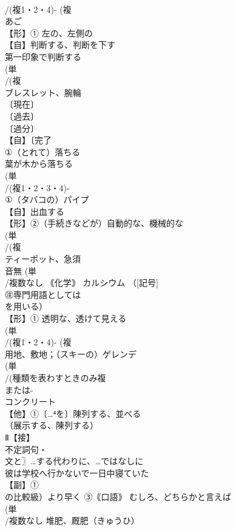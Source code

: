 \documentclass[8pt]{extreport}
\begin{document}
\begin{CJK}{UTF8}{min}
\\	/(複1・2・4)- (複
\\	あご
\\	【形】① 左の、左側の 
\\	【自】判断する、判断を下す 
\\	第一印象で判断する
\\	(単
\\	/(複
\\	ブレスレット、腕輪 
\\	〔現在〕
\\	〔過去〕
\\	〔過分〕
\\	【自】〔完了
\\	①（とれて）落ちる 
\\	葉が木から落ちる
\\	(単
\\	/(複1・2・3・4)‐
\\	①（タバコの）パイプ 
\\	【自】出血する 
\\	【形】②（手続きなどが）自動的な、機械的な
\\	(単
\\	/(複
\\	ティーポット、急須 
\\	音無	(単
\\	/複数なし ｟化学｠ カルシウム （[記号]
\\	㊟専門用語としては
\\	を用いる）
\\	【形】① 透明な、透けて見える 
\\	(単
\\	/(複1・2・4)- (複
\\	用地、敷地；（スキーの）ゲレンデ
\\	(単
\\	/(種類を表わすときのみ複
\\	または-
\\	コンクリート 
\\	【他】①〔…⁴を〕陳列する、並べる 
\\	（展示する、陳列する）
\\	Ⅱ【接】
\\	不定詞句・
\\	文と〗…する代わりに、…ではなしに 
\\	彼は学校へ行かないで一日中寝ていた
\\	【副】①
\\	の比較級）より早く ③｟口語｠ むしろ、どちらかと言えば
\\	(単
\\	/複数なし 堆肥、厩肥（きゅうひ） 

\end{CJK}
\end{document}
